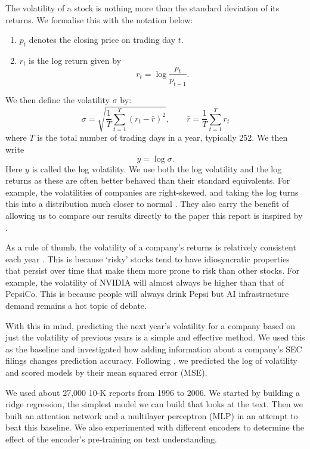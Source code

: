 \documentclass[11pt,a4paper]{article}
\begin{document}
The volatility of a stock is nothing more than the standard deviation of its returns. We formalise this with the notation below:
\begin{enumerate}
  \item $p_t$ denotes the closing price on trading day $t$.
  \item $r_t$ is the log return given by
  \begin{equation}\label{eq:logreturn}
    r_t = \log\frac{p_t}{p_{t-1}}.
  \end{equation}
\end{enumerate}
We then define the volatility $\sigma$ by:
\begin{equation}\label{eq:vol}
  \sigma = \sqrt{\frac{1}{T}\sum_{t=1}^{T}\left(r_t - \bar{r}\right)^2},
  \qquad \bar{r} = \frac{1}{T}\sum_{t=1}^{T} r_t
\end{equation}
where $T$ is the total number of trading days in a year, typically 252. We then write
\begin{equation}\label{eq:logvol}
  y = \log \sigma\text{.}
\end{equation}
Here $y$ is called the log volatility. We use both the log volatility and the log returns as these are often better behaved than their standard equivalents. For example, the volatilities of companies are right-skewed, and taking the log turns this into a distribution much closer to normal \citep{andersen2001}. They also carry the benefit of allowing us to compare our results directly to the paper this report is inspired by \citep{kogan2009}.

As a rule of thumb, the volatility of a company's returns is relatively consistent each year \citep{engle1982}. This is because `risky' stocks tend to have idiosyncratic properties that persist over time that make them more prone to risk than other stocks. For example, the volatility of NVIDIA will almost always be higher than that of PepsiCo. This is because people will always drink Pepsi but AI infrastructure demand remains a hot topic of debate.

With this in mind, predicting the next year's volatility for a company based on just the volatility of previous years is a simple and effective method. We used this as the baseline and investigated how adding information about a company's SEC filings changes prediction accuracy. Following \citet{kogan2009}, we predicted the log of volatility and scored models by their mean squared error (MSE).

We used about 27,000 10-K reports from 1996 to 2006. We started by building a ridge regression, the simplest model we can build that looks at the text. Then we built an attention network and a multilayer perceptron (MLP) in an attempt to beat this baseline. We also experimented with different encoders to determine the effect of the encoder's pre-training on text understanding.
\end{document}
